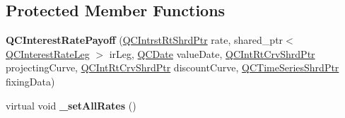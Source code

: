 \subsection*{Protected Member Functions}
\begin{DoxyCompactItemize}
\item 
\hypertarget{class_q_c_interest_rate_payoff_a3ef90fad027f853c7d70ad3ae609edc6}{{\bfseries Q\+C\+Interest\+Rate\+Payoff} (\hyperlink{_q_c_definitions_8h_ae6a21ad26d19e482e3b01179cbc05298}{Q\+C\+Intrst\+Rt\+Shrd\+Ptr} rate, shared\+\_\+ptr$<$ \hyperlink{class_q_c_interest_rate_leg}{Q\+C\+Interest\+Rate\+Leg} $>$ ir\+Leg, \hyperlink{class_q_c_date}{Q\+C\+Date} value\+Date, \hyperlink{_q_c_definitions_8h_a4b4fb466e49550e3dfd40003562cd19d}{Q\+C\+Int\+Rt\+Crv\+Shrd\+Ptr} projecting\+Curve, \hyperlink{_q_c_definitions_8h_a4b4fb466e49550e3dfd40003562cd19d}{Q\+C\+Int\+Rt\+Crv\+Shrd\+Ptr} discount\+Curve, \hyperlink{_q_c_definitions_8h_a6a601ffd693c05dd81309e3dca08b8f5}{Q\+C\+Time\+Series\+Shrd\+Ptr} fixing\+Data)}\label{class_q_c_interest_rate_payoff_a3ef90fad027f853c7d70ad3ae609edc6}

\item 
\hypertarget{class_q_c_interest_rate_payoff_aae61a0e8b38e909f31b6b170a5785748}{virtual void {\bfseries \+\_\+set\+All\+Rates} ()}\label{class_q_c_interest_rate_payoff_aae61a0e8b38e909f31b6b170a5785748}

\end{DoxyCompactItemize}
